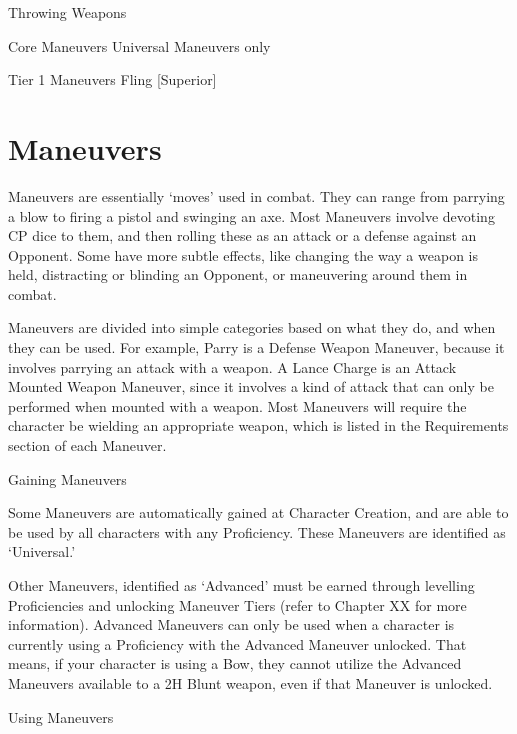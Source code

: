 \documentclass[oneside,11pt,english]{book}
\begin{document}
 

Throwing Weapons 

 

Core Maneuvers 
Universal Maneuvers only 

 

Tier 1 Maneuvers 
Fling [Superior] 

 

\chapter{Maneuvers}\label{ch:maneuvers}
\startcontents[chapters]
\clearpage
Maneuvers are essentially ‘moves’ used in combat. They can range from parrying a blow to firing a pistol 
and swinging an axe. Most Maneuvers involve devoting CP dice to them, and then rolling these as an 
attack or a defense against an Opponent. Some have more subtle effects, like changing the way a weapon 
is held, distracting or blinding an Opponent, or maneuvering around them in combat. 


Maneuvers are divided into simple categories based on what they do, and when they can be used. For 
example, Parry is a Defense Weapon Maneuver, because it involves parrying an attack with a weapon. A 
Lance Charge is an Attack Mounted Weapon Maneuver, since it involves a kind of attack that can only be 
performed when mounted with a weapon. Most Maneuvers will require the character be wielding an 
appropriate weapon, which is listed in the Requirements section of each Maneuver. 


Gaining Maneuvers 

 

Some Maneuvers are automatically gained at Character Creation, and are able to be used by all characters 
with any Proficiency. These Maneuvers are identified as ‘Universal.’ 

 

Other Maneuvers, identified as ‘Advanced’ must be earned through levelling Proficiencies and unlocking 
Maneuver Tiers (refer to Chapter XX for more information). Advanced Maneuvers can only be used 
when a character is currently using a Proficiency with the Advanced Maneuver unlocked. That means, if 
your character is using a Bow, they cannot utilize the Advanced Maneuvers available to a 2H Blunt 
weapon, even if that Maneuver is unlocked. 

 

 

Using Maneuvers 
\end{document}
